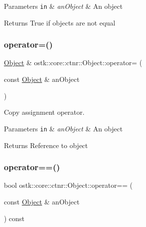 \begin{DoxyParams}[1]{Parameters}
\mbox{\tt in}  & {\em an\+Object} & An object \\
\hline
\end{DoxyParams}
\begin{DoxyReturn}{Returns}
True if objects are not equal 
\end{DoxyReturn}
\mbox{\label{classostk_1_1core_1_1ctnr_1_1_object_a575cbad747a3c84172172309bd8b50b2}} 
\subsubsection{\texorpdfstring{operator=()}{operator=()}}
{\footnotesize\ttfamily \hyperlink{classostk_1_1core_1_1ctnr_1_1_object}{Object} \& ostk\+::core\+::ctnr\+::\+Object\+::operator= (\begin{DoxyParamCaption}\item[{const \hyperlink{classostk_1_1core_1_1ctnr_1_1_object}{Object} \&}]{an\+Object }\end{DoxyParamCaption})}



Copy assignment operator. 


\begin{DoxyParams}[1]{Parameters}
\mbox{\tt in}  & {\em an\+Object} & An object \\
\hline
\end{DoxyParams}
\begin{DoxyReturn}{Returns}
Reference to object 
\end{DoxyReturn}
\mbox{\label{classostk_1_1core_1_1ctnr_1_1_object_a1c940e65a47c52815da5b2e86eaa5264}} 
\subsubsection{\texorpdfstring{operator==()}{operator==()}}
{\footnotesize\ttfamily bool ostk\+::core\+::ctnr\+::\+Object\+::operator== (\begin{DoxyParamCaption}\item[{const \hyperlink{classostk_1_1core_1_1ctnr_1_1_object}{Object} \&}]{an\+Object }\end{DoxyParamCaption}) const}



